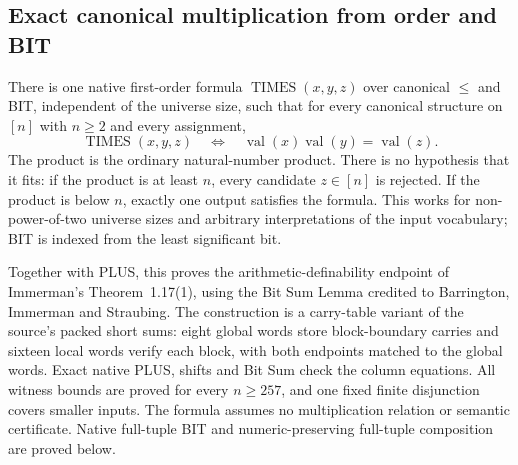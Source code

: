 \begin{result}
\subsection{Exact canonical multiplication from order and BIT}
There is one native first-order formula $\operatorname{TIMES}(x,y,z)$ over
canonical $\le$ and BIT, independent of the universe size, such that for every
canonical structure on $[n]$ with $n\ge2$ and every assignment,
\[
\operatorname{TIMES}(x,y,z)\quad\Longleftrightarrow\quad
\operatorname{val}(x)\operatorname{val}(y)=\operatorname{val}(z).
\]
The product is the ordinary natural-number product. There is no hypothesis that
it fits: if the product is at least $n$, every candidate $z\in[n]$ is rejected.
If the product is below $n$, exactly one output satisfies the formula. This works
for non-power-of-two universe sizes and arbitrary interpretations of the input
vocabulary; BIT is indexed from the least significant bit.

Together with PLUS, this proves the arithmetic-definability endpoint of
Immerman's Theorem~1.17(1), using the Bit Sum Lemma credited to Barrington,
Immerman and Straubing.\citep{Immerman1999,BarringtonImmermanStraubing1990}
The construction is a carry-table variant of the source's packed short sums:
eight global words store block-boundary carries and sixteen local words verify
each block, with both endpoints matched to the global words. Exact native PLUS,
shifts and Bit Sum check the column equations. All witness bounds are proved for
every $n\ge257$, and one fixed finite disjunction covers smaller inputs.
The formula assumes no multiplication relation or semantic certificate.
Native full-tuple BIT and numeric-preserving full-tuple composition are proved below.
\end{result}

